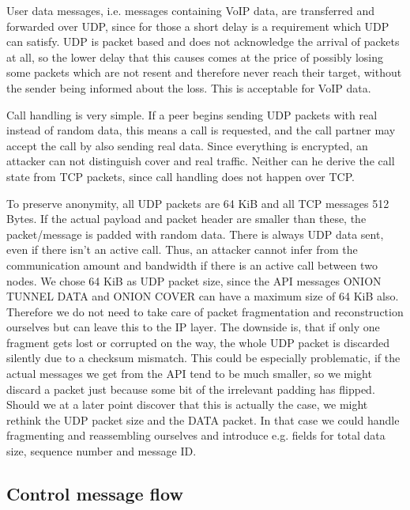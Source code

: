 \documentclass{article}
\begin{document}
User data messages, i.e. messages containing VoIP data, are transferred and forwarded over UDP, since for those a short delay is a requirement which UDP can satisfy. UDP is packet based and does not acknowledge the arrival of packets at all, so the lower delay that this causes comes at the price of possibly losing some packets which are not resent and therefore never reach their target, without the sender being informed about the loss. This is acceptable for VoIP data.

Call handling is very simple. If a peer begins sending UDP packets with real instead of random data, this means a call is requested, and the call partner may accept the call by also sending real data. Since everything is encrypted, an attacker can not distinguish cover and real traffic. Neither can he derive the call state from TCP packets, since call handling does not happen over TCP.

To preserve anonymity, all UDP packets are 64 KiB and all TCP messages 512 Bytes. If the actual payload and packet header are smaller than these, the packet/message is padded with random data. There is always UDP data sent, even if there isn't an active call. Thus, an attacker cannot infer from the communication amount and bandwidth if there is an active call between two nodes.
We chose 64 KiB as UDP packet size, since the API messages ONION TUNNEL DATA and ONION COVER can have a maximum size of 64 KiB also. Therefore we do not need to take care of packet fragmentation and reconstruction ourselves but can leave this to the IP layer. The downside is, that if only one fragment gets lost or corrupted on the way, the whole UDP packet is discarded silently due to a checksum mismatch. This could be especially problematic, if the actual messages we get from the API tend to be much smaller, so we might discard a packet just because some bit of the irrelevant padding has flipped. Should we at a later point discover that this is actually the case, we might rethink the UDP packet size and the DATA packet. In that case we could handle fragmenting and reassembling ourselves and introduce e.g. fields for total data size, sequence number and message ID.


\subsection{Control message flow}
\end{document}
